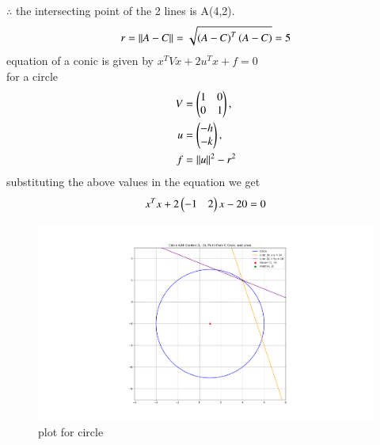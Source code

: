 \documentclass[journal]{IEEEtran}
\begin{document}
$\therefore$ the intersecting point of the 2 lines is A(4,2).\\
\begin{align*}
	r = \left\lVert A-C\right\rVert = \sqrt{\left(A-C\right)^T\left(A-C\right)} &= 5\\
\end{align*}
equation of a conic is given by  $x^TVx + 2u^Tx + f = 0$\\
 for a circle
\begin{align*}
 V &= \begin{pmatrix}1&0\\0&1\end{pmatrix},\\ 
u&=\begin{pmatrix}-h\\-k\end{pmatrix}, \\
f &= \left\lVert u\right\rVert^2 - r^2\\
\end{align*}
substituting the above values in the equation we get 
\begin{align*}
x^Tx + 2\begin{pmatrix}-1 & 2\end{pmatrix}x - 20 = 0
\end{align*}
\begin{figure}[h!]
\centering
\includegraphics[width=0.7\columnwidth]{figs/Figure_1.png}
\caption{plot for circle}
 \label{fig. 7-7.2-22.1}
\end{figure}
\end{document}
